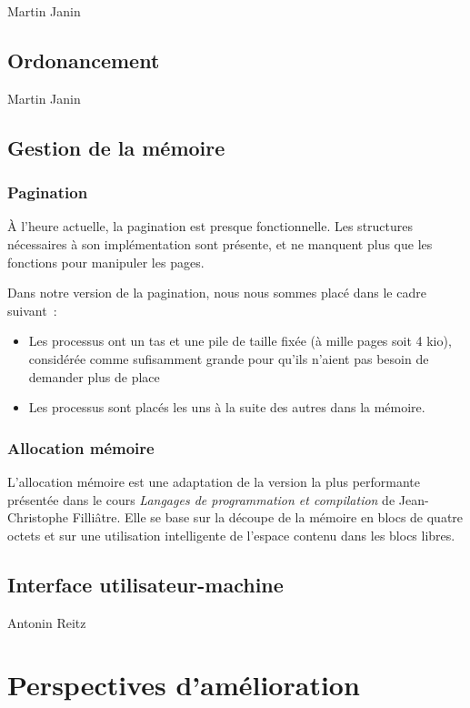 \documentclass[a4paper,11pt]{article}
\begin{document}
Martin Janin

\subsection{Ordonancement}

Martin Janin

\subsection{Gestion de la mémoire}

\subsubsection{Pagination}

À l'heure actuelle, la pagination est presque fonctionnelle. Les structures
nécessaires à son implémentation sont présente, et ne manquent plus que les
fonctions pour manipuler les pages.

Dans notre version de la pagination, nous nous sommes placé dans le cadre
suivant~:
\begin{itemize}
  \item Les processus ont un tas et une pile de taille fixée (à mille pages soit
    4 kio), considérée comme sufisamment grande pour qu'ils n'aient pas besoin
    de demander plus de place
  \item Les processus sont placés les uns à la suite des autres dans la mémoire.
\end{itemize}

\subsubsection{Allocation mémoire}

L'allocation mémoire est une adaptation de la version la plus performante
présentée dans le cours \emph{Langages de programmation et compilation} de
Jean-Christophe Filliâtre. Elle se base sur la découpe de la mémoire en blocs de
quatre octets et sur une utilisation intelligente de l'espace contenu dans les
blocs libres.

\subsection{Interface utilisateur-machine}

Antonin Reitz

\section{Perspectives d'amélioration}
\end{document}
